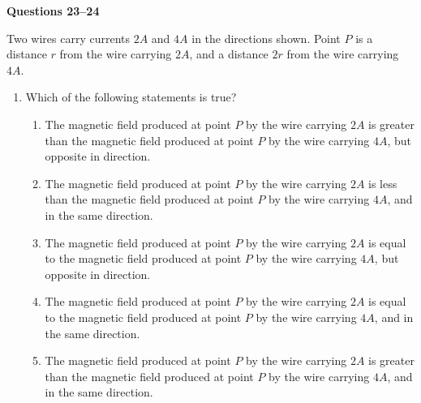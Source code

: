 \documentclass{../../oss-apphys}
\begin{document}
\begin{multicols}{2}
\begin{enumerate}[leftmargin=18pt,resume]
  \end{enumerate}
  \textbf{Questions 23--24}
  
  Two wires carry currents $2A$ and $4A$ in the directions shown. Point $P$ is a
  distance $r$ from the wire carrying $2A$, and a distance $2r$ from the wire
  carrying $4A$.
  \begin{center}
  \end{center}
  \begin{enumerate}[leftmargin=18pt,resume]
  \item Which of the following statements is true?
    \begin{enumerate}[noitemsep,topsep=0pt,leftmargin=18pt,label=(\Alph*)]
    \item The magnetic field produced at point $P$ by the wire carrying $2A$ is
      greater than the magnetic field produced at point $P$ by the wire
      carrying $4A$, but opposite in direction.
    \item The magnetic field produced at point $P$ by the wire carrying $2A$ is
      less than the magnetic field produced at point $P$ by the wire
      carrying $4A$, and in the same direction.
    \item The magnetic field produced at point $P$ by the wire carrying $2A$ is
      equal to the magnetic field produced at point $P$ by the wire
      carrying $4A$, but opposite in direction.
    \item The magnetic field produced at point $P$ by the wire carrying $2A$ is
      equal to the magnetic field produced at point $P$ by the wire
      carrying $4A$, and in the same direction.
    \item The magnetic field produced at point $P$ by the wire carrying $2A$ is
      greater than the magnetic field produced at point $P$ by the wire
      carrying $4A$, and in the same direction.
    \end{enumerate}
    

\end{enumerate}
\end{multicols}
\end{document}
